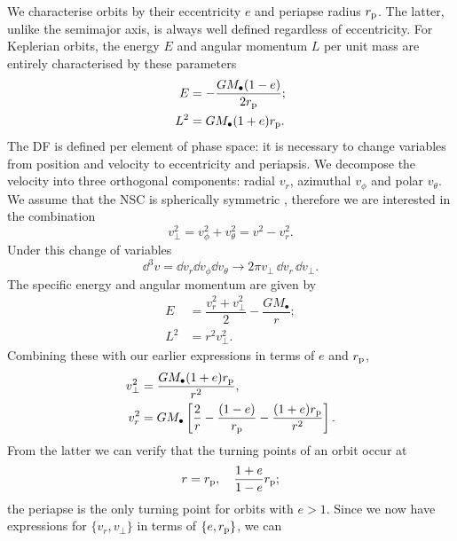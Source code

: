 We characterise orbits by their eccentricity $e$ and periapse radius $r_\mathrm{p}$. The latter, unlike the semimajor axis, is always well defined regardless of eccentricity. For Keplerian orbits, the energy $E$ and angular momentum $L$ per unit mass are entirely characterised by these parameters
\begin{equation}
\label{eq:Energy_ecc}
\begin{split}
E & = -\dfrac{GM_\bullet(1 - e)}{2r_\mathrm{p}}; \\
L^2 & = GM_\bullet(1 + e)r_\mathrm{p}.
\end{split}
\end{equation}
The DF is defined per element of phase space: it is necessary to change variables from position and velocity to eccentricity and periapsis. We decompose the velocity into three orthogonal components: radial $v_r$, azimuthal $v_\phi$ and polar $v_\theta$. We assume that the NSC is spherically symmetric \citep{Genzel2003, Schodel2007}, therefore we are interested in the combination
\begin{equation}
v_\perp^2 = v_\phi^2 + v_\theta^2 = v^2 - v_r^2.
\end{equation}
Under this change of variables
\begin{equation}
\dd^3v = \dd v_r \dd v_\phi \dd v_\theta \rightarrow 2\pi v_\perp \,\dd v_r \,\dd v_\perp.
\end{equation}
The specific energy and angular momentum are given by
\begin{equation}
\begin{split}
E & = \dfrac{v_r^2 + v_\perp^2}{2} - \dfrac{GM_\bullet}{r}; \\
L^2 & = r^2 v_\perp^2.
\end{split}
\end{equation}
Combining these with our earlier expressions in terms of $e$ and $r_\mathrm{p}$,
\begin{align}
v_\perp^2 = {} & \dfrac{GM_\bullet(1 + e)r_\mathrm{p}}{r^2}, \\
v_r^2 = {} & GM_\bullet\left[\dfrac{2}{r} - \dfrac{(1 - e)}{r_\mathrm{p}} - \dfrac{(1 + e)r_\mathrm{p}}{r^2}\right].
\end{align}
From the latter we can verify that the turning points of an orbit occur at
\begin{equation}
r = r_\mathrm{p}, \quad \dfrac{1+e}{1-e}r_\mathrm{p};
\end{equation}
the periapse is the only turning point for orbits with $e > 1$. Since we now have expressions for $\{v_r, v_\perp\}$ in terms of $\{e, r_\mathrm{p}\}$, we can 
